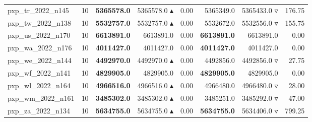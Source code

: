 \begin{table}[]
{\begin{tabular}{ll@{\hspace{1.2cm}}rrr@{\hspace{1.2cm}}rrr}
pxp_tr_2022_n145 & 10 & \textbf{5365578.0} & 5365578.0 $\blacktriangle$ & 0.00 & 5365349.0 & 5365433.0 $\triangledown$ & 176.75 \\
pxp_tw_2022_n138 & 10 & \textbf{5532757.0} & 5532757.0 $\blacktriangle$ & 0.00 & 5532672.0 & 5532556.0 $\triangledown$ & 155.75 \\
pxp_us_2022_n170 & 10 & \textbf{6613891.0} & 6613891.0 \phantom{$\blacktriangle$} & 0.00 & \textbf{6613891.0} & 6613891.0 \phantom{$\blacktriangle$} & 0.00 \\
pxp_wa_2022_n176 & 10 & \textbf{4011427.0} & 4011427.0 \phantom{$\blacktriangle$} & 0.00 & \textbf{4011427.0} & 4011427.0 \phantom{$\blacktriangle$} & 0.00 \\
pxp_we_2022_n144 & 10 & \textbf{4492970.0} & 4492970.0 $\blacktriangle$ & 0.00 & 4492856.0 & 4492856.0 $\triangledown$ & 27.75 \\
pxp_wf_2022_n141 & 10 & \textbf{4829905.0} & 4829905.0 \phantom{$\blacktriangle$} & 0.00 & \textbf{4829905.0} & 4829905.0 \phantom{$\blacktriangle$} & 0.00 \\
pxp_wl_2022_n164 & 10 & \textbf{4966516.0} & 4966516.0 $\blacktriangle$ & 0.00 & 4966480.0 & 4966480.0 $\triangledown$ & 28.00 \\
pxp_wm_2022_n161 & 10 & \textbf{3485302.0} & 3485302.0 $\blacktriangle$ & 0.00 & 3485251.0 & 3485292.0 $\triangledown$ & 47.00 \\
pxp_za_2022_n134 & 10 & \textbf{5634755.0} & 5634755.0 $\blacktriangle$ & 0.00 & \textbf{5634755.0} & 5634406.0 $\triangledown$ & 799.25 \\
\bottomrule
    \end{tabular}
    }
\end{table}
